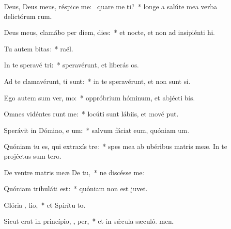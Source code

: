 \item Deus, Deus meus, réspice  me:~\pscross{} quare me ti?~* longe a salúte mea verba delictórum rum.
\item Deus meus, clamábo per diem,   dies:~* et nocte, et non ad insipiénti hi.
\item Tu autem   bitas:~*  raël.
\item In te speravé  tri:~* speravérunt, et liberás os.
\item Ad te clamavérunt,   ti sunt:~* in te speravérunt, et non sunt si.
\item Ego autem sum ver,   mo:~* oppróbrium hóminum, et abjécti bis.
\item Omnes vidéntes  runt me:~* locúti sunt lábiis, et mové put.
\item Sperávit in Dómino, e um:~* salvum fáciat eum, quóniam  um.
\item Quóniam tu es, qui extraxís   tre:~* spes mea ab ubéribus matris meæ. In te projéctus sum  tero.
\item De ventre matris meæ De   tu,~* ne discésse  me:
\item Quóniam tribuláti  est:~* quóniam non est  juvet.
\item Glória ,  lio,~* et Spirítu to.
\item Sicut erat in princípio,  ,  per,~* et in sǽcula sæculó. men.
